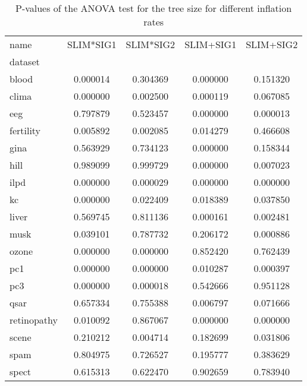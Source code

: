
    \begin{table}[h]
        \centering
        \renewcommand{\arraystretch}{1.2}
        \begin{tabular}{lcccc}
\toprule
name & SLIM*SIG1 & SLIM*SIG2 & SLIM+SIG1 & SLIM+SIG2 \\
dataset &  &  &  &  \\
\midrule
blood & 0.000014 & 0.304369 & 0.000000 & 0.151320 \\
clima & 0.000000 & 0.002500 & 0.000119 & 0.067085 \\
eeg & 0.797879 & 0.523457 & 0.000000 & 0.000013 \\
fertility & 0.005892 & 0.002085 & 0.014279 & 0.466608 \\
gina & 0.563929 & 0.734123 & 0.000000 & 0.158344 \\
hill & 0.989099 & 0.999729 & 0.000000 & 0.007023 \\
ilpd & 0.000000 & 0.000029 & 0.000000 & 0.000000 \\
kc & 0.000000 & 0.022409 & 0.018389 & 0.037850 \\
liver & 0.569745 & 0.811136 & 0.000161 & 0.002481 \\
musk & 0.039101 & 0.787732 & 0.206172 & 0.000886 \\
ozone & 0.000000 & 0.000000 & 0.852420 & 0.762439 \\
pc1 & 0.000000 & 0.000000 & 0.010287 & 0.000397 \\
pc3 & 0.000000 & 0.000018 & 0.542666 & 0.951128 \\
qsar & 0.657334 & 0.755388 & 0.006797 & 0.071666 \\
retinopathy & 0.010092 & 0.867067 & 0.000000 & 0.000000 \\
scene & 0.210212 & 0.004714 & 0.182699 & 0.031806 \\
spam & 0.804975 & 0.726527 & 0.195777 & 0.383629 \\
spect & 0.615313 & 0.622470 & 0.902659 & 0.783940 \\
\bottomrule
\end{tabular}

        \caption{P-values of the ANOVA test for the tree size for different inflation rates}
        \label{tab:anova_nodes}
    \end{table}
    
